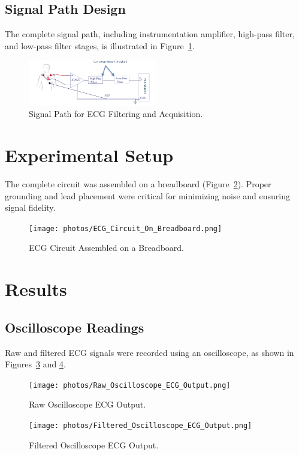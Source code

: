 \documentclass[11pt]{article}
\begin{document}
\subsection{Signal Path Design}
The complete signal path, including instrumentation amplifier, high-pass filter, and low-pass filter stages, is illustrated in Figure~\ref{fig:signalpath}.
\begin{figure}[H]
  \centering
  \includegraphics[width=0.5\textwidth]{photos/Signal_Path_for_ECG_Filtering_and_Acquisition.png}
  \caption{Signal Path for ECG Filtering and Acquisition.}
  \label{fig:signalpath}
\end{figure}
\section{Experimental Setup}
The complete circuit was assembled on a breadboard (Figure~\ref{fig:breadboard}). Proper grounding and lead placement were critical for minimizing noise and ensuring signal fidelity.
\begin{figure}[H]
  \centering
  \texttt{[image: photos/ECG\_Circuit\_On\_Breadboard.png]}
  \caption{ECG Circuit Assembled on a Breadboard.}
  \label{fig:breadboard}
\end{figure}
\section{Results}
\subsection{Oscilloscope Readings}
Raw and filtered ECG signals were recorded using an oscilloscope, as shown in Figures~\ref{fig:rawosc} and \ref{fig:filteredosc}.
\begin{figure}[H]
  \centering
  \texttt{[image: photos/Raw\_Oscilloscope\_ECG\_Output.png]}
  \caption{Raw Oscilloscope ECG Output.}
  \label{fig:rawosc}
\end{figure}
\begin{figure}[H]
  \centering
  \texttt{[image: photos/Filtered\_Oscilloscope\_ECG\_Output.png]}
  \caption{Filtered Oscilloscope ECG Output.}
  \label{fig:filteredosc}
\end{figure}
\end{document}
